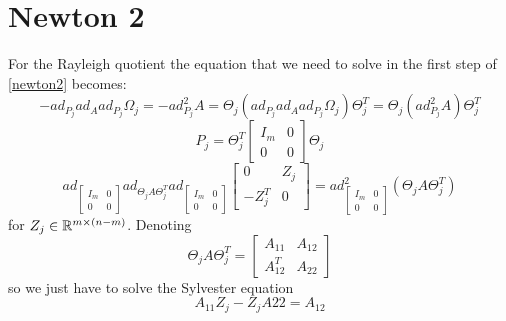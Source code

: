\documentclass[11pt,a4paper]{report}
\begin{document}
\section{Newton 2}

For the Rayleigh quotient the equation that we need to solve in the first step of \ref{newton2} becomes:
$$ -ad_{P_j} ad_{A} ad_{P_j} \Omega_j = - ad^2_{P_j} A = \Theta_j(ad_{P_j} ad_A ad_{P_j} \Omega_j) \Theta_j^T = \Theta_j (ad_{P_j}^2 A) \Theta_j^T  $$
$$ P_j = \Theta_j^T \begin{bmatrix} I_m & 0 \\ 0 & 0 \end{bmatrix} \Theta_j $$
$$ ad_{\begin{bmatrix} I_m & 0 \\ 0 & 0  \end{bmatrix} } ad_{\Theta_j A \Theta_j^T} ad_{\begin{bmatrix} I_m & 0 \\ 0 & 0 \end{bmatrix}}
    \begin{bmatrix} 0 & Z_j \\ -Z_j^T & 0 \end{bmatrix} = ad^2_{\begin{bmatrix}  I_m & 0 \\ 0 & 0 \end{bmatrix}} (\Theta_j A \Theta_j^T)$$ 
    for $Z_j \in \mathbb{R}^{m \times (n-m)}$. Denoting
    $$\Theta_j A \Theta_j^T = \begin{bmatrix} A_{11} & A_{12} \\ A_{12}^T & A_{22} \end{bmatrix} $$
    so we just have to solve the Sylvester equation
    $$ A_{11} Z_j - Z_j A22 = A_{12} $$
\end{document}
